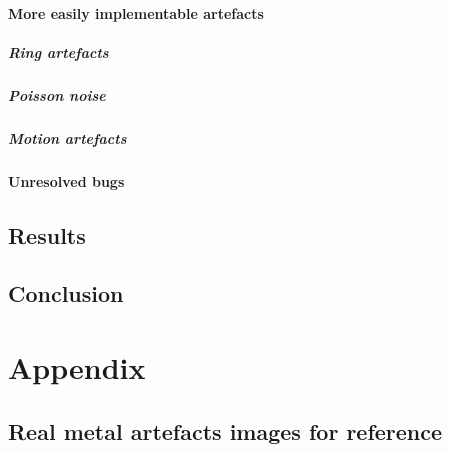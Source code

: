 \subsection{More easily implementable artefacts}
\subsubsection{Ring artefacts}
\subsubsection{Poisson noise}
\subsubsection{Motion artefacts}
\subsection{Unresolved bugs}

\chapter{Results}

\chapter{Conclusion}




%
%
\part*{Appendix}

\appendix %
\chapter{Real metal artefacts images for reference}
\label{chapter:RealMetal}

